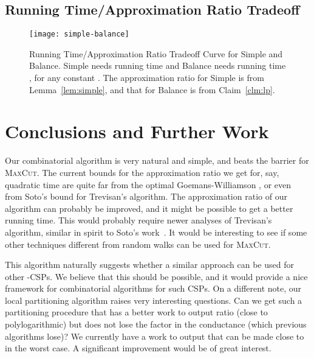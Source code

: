 \documentclass[11pt]{article}
\newcommand\Balance{{\sc Balance}\xspace}
\newcommand\Simple{{\sc Simple}\xspace}
\def\maxcut{\textsc{MaxCut}\xspace}
\begin{document}
\subsection{Running Time/Approximation Ratio Tradeoff}


\begin{figure}[htbp] \centering
    \texttt{[image: simple-balance]} \caption{Running Time/Approximation Ratio Tradeoff Curve for \Simple and \Balance. \Simple
    needs running time  and \Balance needs running time , for any constant . The approximation ratio for \Simple is from Lemma~\ref{lem:simple}, and that for \Balance is from Claim~\ref{clm:lp}.}
    \label{fig:simple-balance}
\end{figure}


\section{Conclusions and Further Work}

Our combinatorial algorithm is very natural and simple, and beats
the  barrier for \maxcut. The current bounds for the approximation
ratio we get for, say, quadratic time are quite far from the
optimal Goemans-Williamson , or even from Soto's  bound
for Trevisan's algorithm.
The approximation ratio of our algorithm can probably be improved, and it might
be possible to get a better running time. This would probably
require newer analyses of Trevisan's algorithm, similar in spirit
to Soto's work~\cite{Sot09}.
It would be interesting to
see if some other techniques different from random walks
can be used for \maxcut.

This algorithm naturally suggests whether a similar approach can
be used for other -CSPs. We believe that this should be possible,
and it would provide a nice framework for combinatorial algorithms
for such CSPs. On a different note, our local partitioning algorithm
raises very interesting questions. Can we get such a partitioning
procedure that has a better work to output ratio (close to polylogarithmic)
but does not lose the  factor in the conductance
(which previous algorithms lose)? We currently have a work to output
that can be made close to  in the worst case.
A significant improvement would be of great interest.



\end{document}
